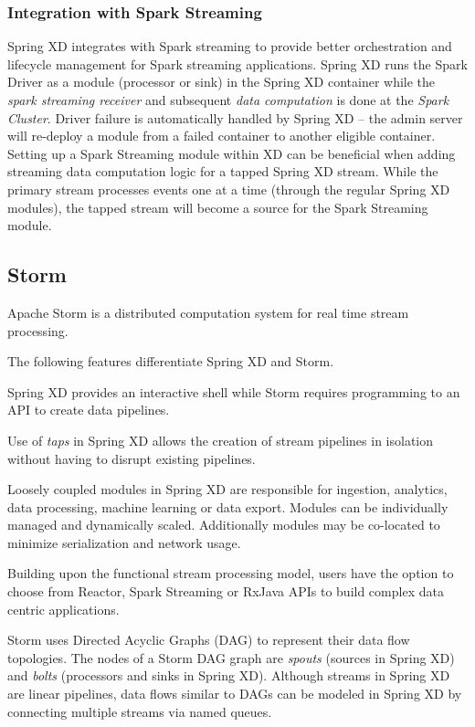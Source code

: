 \subsubsection{Integration with Spark Streaming}
Spring XD integrates with Spark streaming to provide better orchestration and
lifecycle management for Spark streaming applications. Spring XD runs the
Spark Driver as a module (processor or sink) in the Spring XD container
while the \emph{spark streaming receiver} and subsequent \emph{data computation} is
done at the \emph{Spark Cluster}. Driver failure is automatically handled by
Spring XD -- the admin server will re-deploy a module from a failed container
to another eligible container.
Setting up a Spark Streaming module within XD can be beneficial when adding
streaming data computation logic for a tapped Spring XD stream. While the primary
stream processes events one at a time (through the regular Spring XD modules),
the tapped stream will become a source for the Spark Streaming module.

\subsection{Storm}
Apache Storm\cite{storm} is a distributed computation system for real time stream
processing.

The following features differentiate Spring XD and Storm.

\begin{itemize*}
\item Spring XD provides an interactive shell while Storm requires programming
to an API to create data pipelines.
\item Use of \emph{taps} in Spring XD allows the creation of stream pipelines
in isolation without having to disrupt existing pipelines.
\item Loosely coupled modules in Spring XD are responsible for ingestion, analytics,
data processing, machine learning or data export. Modules can be individually managed
and dynamically scaled. Additionally modules may be co-located to minimize
serialization and network usage.
\item Building upon the functional stream processing model, users have the option
to choose from Reactor\cite{reactor}, Spark Streaming or RxJava APIs to build
complex data centric applications.
\end{itemize*}

Storm uses Directed Acyclic Graphs (DAG)\cite{dag} to represent
their data flow topologies. The nodes of a Storm DAG graph are \emph{spouts}
(sources in Spring XD) and \emph{bolts} (processors and sinks
in Spring XD). Although streams in Spring XD are linear pipelines,
data flows similar to DAGs can be modeled in Spring XD by connecting
multiple streams via named queues.

